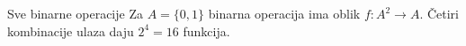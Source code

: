\begin{frame}[label=01-s015]{Sve binarne operacije}
Za \(A=\{0,1\}\) binarna operacija ima oblik \(f:A^2\to A\). Četiri kombinacije ulaza daju \(2^4=16\) funkcija.
\centering

\end{frame}
